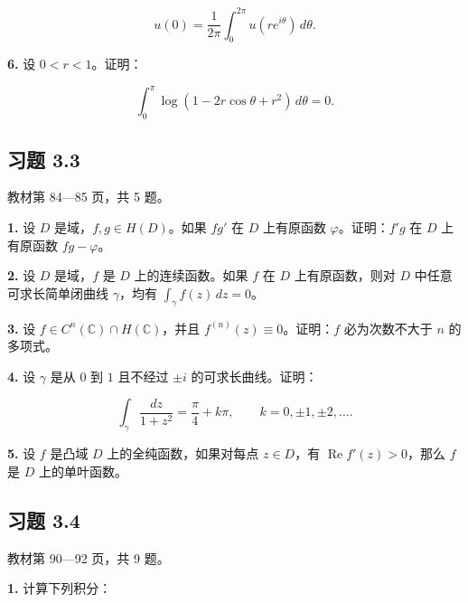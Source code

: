\documentclass[11pt,a4paper]{article}
\begin{document}
\[
u(0)=\frac1{2\pi}\int_0^{2\pi}u(re^{i\theta})\,d\theta.
\]

\par{}
\noindent\textbf{6.} 设 \(0<r<1\)。证明：

\[
\int_0^\pi\log(1-2r\cos\theta+r^2)\,d\theta=0.
\]

\subsection{习题 3.3}\label{ch03-practice-ux4e60ux9898-33}

教材第 84---85 页，共 5 题。

\par{}
\noindent\textbf{1.} 设 \(D\) 是域，\(f,g\in H(D)\)。如果 \(fg'\) 在 \(D\)
上有原函数 \(\varphi\)。证明：\(f'g\) 在 \(D\) 上有原函数
\(fg-\varphi\)。

\par{}
\noindent\textbf{2.} 设 \(D\) 是域，\(f\) 是 \(D\) 上的连续函数。如果 \(f\) 在
\(D\) 上有原函数，则对 \(D\) 中任意可求长简单闭曲线 \(\gamma\)，均有
\(\int_\gamma f(z)\,dz=0\)。

\par{}
\noindent\textbf{3.} 设 \(f\in C^n(\mathbb C)\cap H(\mathbb C)\)，并且
\(f^{(n)}(z)\equiv0\)。证明：\(f\) 必为次数不大于 \(n\) 的多项式。

\par{}
\noindent\textbf{4.} 设 \(\gamma\) 是从 \(0\) 到 \(1\) 且不经过 \(\pm i\)
的可求长曲线。证明：

\[
\int_\gamma\frac{dz}{1+z^2}=\frac\pi4+k\pi,
\qquad k=0,\pm1,\pm2,\ldots.
\]

\par{}
\noindent\textbf{5.} 设 \(f\) 是凸域 \(D\) 上的全纯函数，如果对每点
\(z\in D\)，有 \(\operatorname{Re}f'(z)>0\)，那么 \(f\) 是 \(D\)
上的单叶函数。

\subsection{习题 3.4}\label{ch03-practice-ux4e60ux9898-34}

教材第 90---92 页，共 9 题。

\par{}
\noindent\textbf{1.} 计算下列积分：
\end{document}
